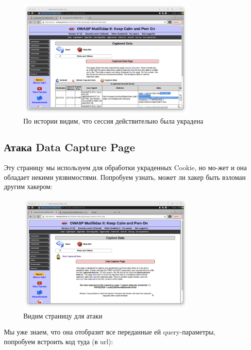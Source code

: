 \documentclass[a4paper]{article}
\begin{document}
  \begin{figure}[H]
    \centering
    \includegraphics[width=0.8\textwidth]{step_00019}
    \caption{По истории видим, что сессия действительно была украдена}
  \end{figure}

  \subsection{Атака Data Capture Page}

  Эту страницу мы используем для обработки украденных Cookie, но мо-жет и она
  обладает некими уязвимостями. Попробуем узнать, может ли хакер быть взломан
  другим хакером:

  \begin{figure}[H]
    \centering
    \includegraphics[width=0.8\textwidth]{step_00020}
    \caption{Видим страницу для атаки}
  \end{figure}

  Мы уже знаем, что она отобразит все переданные ей query-параметры, попробуем
  встроить код туда (в url):
\end{document}
